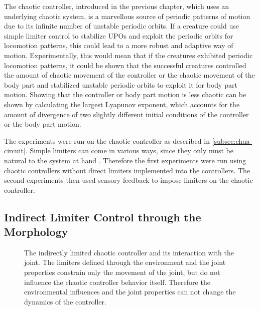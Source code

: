 \documentclass[main]{subfiles}
\begin{document}
The chaotic controller, introduced in the previous chapter, which uses an underlying chaotic system, is a marvellous source of periodic patterns of motion due to its infinite number of unstable periodic orbits. %
%
If a creature could use simple limiter control to stabilize UPOs and exploit the periodic orbits for locomotion patterns, this could lead to a more robust and adaptive way of motion. %
%
Experimentally, this would mean that if the creatures exhibited periodic locomotion patterns, it could be shown that the successful creatures controlled the amount of chaotic movement of the controller or the chaotic movement of the body part and stabilized unstable periodic orbits to exploit it for body part motion. %
%
Showing that the controller or body part motion is less chaotic can be shown by calculating the largest Lyapunov exponent, which accounts for the amount of divergence of two slightly different initial conditions of the controller or the body part motion.

The experiments were run on the chaotic controller as described in \ref{subsec:chua-circuit}. %
%
Simple limiters can come in various ways, since they only must be natural to the system at hand \cite{bib:Corron2000}. %
%
Therefore the first experiments were run using chaotic controllers without direct limiters implemented into the controllers. %
%
The second experiments then used sensory feedback to impose limiters on the chaotic controller. 

\subsection{Indirect Limiter Control through the Morphology}

\begin{figure}[H]


\caption[The indirectly limited chaotic controller and joint complex]{The indirectly limited chaotic controller and its interaction with the joint. The limiters defined through the environment and the joint properties constrain only the movement of the joint, but do not influence the chaotic controller behavior itself. Therefore the environmental influences and the joint properties can not change the dynamics of the controller.}
\label{figure:indirect-limit-controller-joint-complex}
\end{figure}
\end{document}
